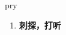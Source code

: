 
\begin{frame}
{\huge pry}
\begin{center}
\begin{enumerate}\Large
  \item \textbf{刺探，打听}
\end{enumerate}
\end{center}
\end{frame}
